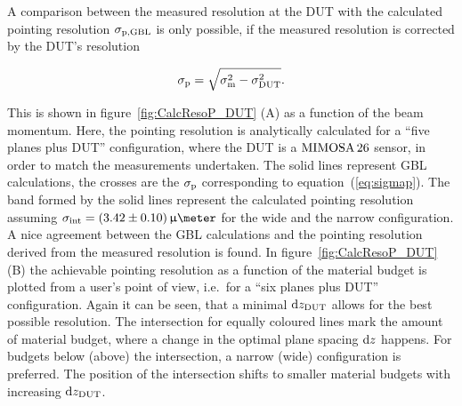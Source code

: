 A comparison between the measured resolution at the DUT with the calculated pointing resolution $\sigma_{\textrm{p,GBL}}$ is only possible, if the measured resolution is corrected by the DUT's resolution

\begin{equation}
 \sigma_{\textrm{p}} = \sqrt{\sigma_{\textrm{m}}^2 - \sigma_{\textrm{DUT}}^2}.
 \label{eq:sigmap}
\end{equation}

\noindent
This is shown in figure~\ref{fig:CalcResoP_DUT} (A) as a function of the beam momentum. 
Here, the pointing resolution is analytically calculated for a ``five planes plus DUT'' configuration, where the DUT is a $\textrm{MIMOSA\,26}$ sensor, in order to match the measurements undertaken. 
The solid lines represent GBL calculations, the crosses are the $\sigma_{\textrm{p}}$ corresponding to equation~(\ref{eq:sigmap}). 
The band formed by the solid lines represent the calculated pointing resolution assuming $\sigmai = (3.42 \pm 0.10)\,\upmu\meter$ for the wide and the narrow configuration. 
A nice agreement between the GBL calculations and the pointing resolution derived from the measured resolution is found.
In figure~\ref{fig:CalcResoP_DUT} (B) the achievable pointing resolution as a function of the material budget is plotted from a user's point of view, i.e.~for a ``six planes plus DUT'' configuration. 
Again it can be seen, that a minimal $\textrm{d}z_{\textrm{DUT}}$ allows for the best possible resolution. 
The intersection for equally coloured lines mark the amount of material budget, where a change in the optimal plane spacing $\textrm{d}z$ happens.
For budgets below (above) the intersection, a narrow (wide) configuration is preferred.
The position of the intersection shifts to smaller material budgets with increasing $\textrm{d}z_{\textrm{DUT}}$. 

